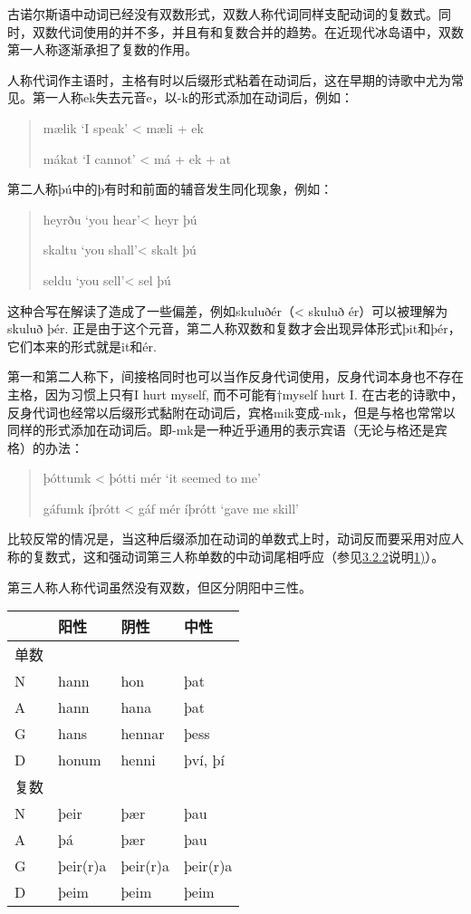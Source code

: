古诺尔斯语中动词已经没有双数形式，双数人称代词同样支配动词的复数式。同时，双数代词使用的并不多，并且有和复数合并的趋势。在近现代冰岛语中，双数第一人称逐渐承担了复数的作用。

人称代词作主语时，主格有时以后缀形式粘着在动词后，这在早期的诗歌中尤为常见。第一人称ek失去元音e，以-k的形式添加在动词后，例如：

\begin{quote}
mælik `I speak‌' \textless{} mæli + ek

mákat `I cannot‌' \textless{} má + ek + at
\end{quote}

第二人称þú中的þ有时和前面的辅音发生同化现象，例如：

\begin{quote}
heyrðu `you hear'\textless{} heyr þú

skaltu `you shall'\textless{} skalt þú

seldu `you sell'\textless{} sel þú
\end{quote}

这种合写在解读了造成了一些偏差，例如skuluðér（\textless{} skuluð
ér）可以被理解为skuluð þér.
正是由于这个元音，第二人称双数和复数才会出现异体形式þit和þér，它们本来的形式就是it和ér.

第一和第二人称下，间接格同时也可以当作反身代词使用，反身代词本身也不存在主格，因为习惯上只有I
hurt myself, 而不可能有†myself hurt I.
在古老的诗歌中，反身代词也经常以后缀形式黏附在动词后，宾格mik变成-mk，但是与格也常常以同样的形式添加在动词后。即-mk是一种近乎通用的表示宾语（无论与格还是宾格）的办法：

\begin{quote}
þóttumk \textless{} þótti mér `it seemed to me‌'

gáfumk íþrótt \textless{} gáf mér íþrótt `gave me skill'
\end{quote}

比较反常的情况是，当这种后缀添加在动词的单数式上时，动词反而要采用对应人称的复数式，这和强动词第三人称单数的中动词尾相呼应（参见\hyperref[ux5f3aux52a8ux8bcdux7684ux4e2dux52a8ux8bcdux5c3e]{3.2.2}说明\hyperref[_Ref117719619]{1)}）。

第三人称人称代词虽然没有双数，但区分阴阳中三性。

\begin{longtable}{llll}
\toprule
 & 阳性 & 阴性 & 中性 \\
\midrule
\endhead
\bottomrule
\endfoot
单数 & & & \\
N & hann & hon & þat \\
A & hann & hana & þat \\
G & hans & hennar & þess \\
D & honum & henni & því, þí \\
复数 & & & \\
N & þeir & þær & þau \\
A & þá & þær & þau \\
G & þeir(r)a & þeir(r)a & þeir(r)a \\
D & þeim & þeim & þeim \\
\end{longtable}

